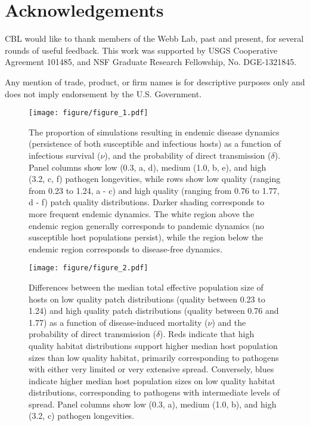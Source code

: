 \documentclass{article}
\begin{document}
\section{Acknowledgements}

CBL would like to thank members of the Webb Lab, past and present, for several rounds of useful feedback.  This work was supported by USGS Cooperative Agreement 101485, and NSF Graduate Research Fellowship, No. DGE-1321845.

Any mention of trade, product, or firm names is for descriptive purposes only and does not imply endorsement by the U.S. Government.

\clearpage

     

\clearpage

\begin{figure}
\texttt{[image: figure/figure\_1.pdf]}
\caption{The proportion of simulations resulting in endemic disease dynamics (persistence of both susceptible and infectious hosts) as a function of infectious survival ($\nu$), and the probability of direct transmission ($\delta$).  Panel columns show low (0.3, a, d), medium (1.0, b, e), and high (3.2, c, f) pathogen longevities, while rows show low quality (ranging from 0.23 to 1.24, a - c) and high quality (ranging from 0.76 to 1.77, d - f) patch quality distributions.  Darker shading corresponds to more frequent endemic dynamics.  The white region above the endemic region generally corresponds to pandemic dynamics (no susceptible host populations persist), while the region below the endemic region corresponds to disease-free dynamics.}
\label{endemic}
\end{figure}

\begin{figure}
\texttt{[image: figure/figure\_2.pdf]}
\centering
\caption{Differences between the median total effective population size of hosts on low quality patch distributions (quality between 0.23 to 1.24) and high quality patch distributions (quality between 0.76 and 1.77) as a function of disease-induced mortality ($\nu$) and the probability of direct transmission ($\delta$).  Reds indicate that high quality habitat distributions support higher median host population sizes than low quality habitat, primarily corresponding to pathogens with either very limited or very extensive spread. Conversely, blues indicate higher median host population sizes on low quality habitat distributions, corresponding to pathogens with intermediate levels of spread.  Panel columns show low (0.3, a), medium (1.0, b), and high (3.2, c) pathogen longevities.}
\label{highvlow}
\end{figure}
\end{document}
